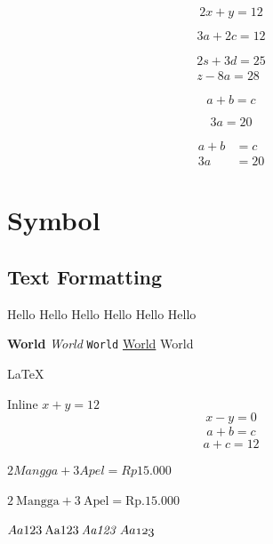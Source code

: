 \documentclass{article}
\begin{document}
    \begin{equation}
        2x + y = 12
    \end{equation}

    \begin{equation*}
        3a + 2c = 12
    \end{equation*}

    \begin{align*}
        2s + 3d = 25\\
        z - 8a = 28 
    \end{align*}

    \begin{equation*}
        a + b = c
    \end{equation*}

    \begin{equation*}
        3a = 20
    \end{equation*}

    \begin{align*}
        a + b &= c\\
        3a &= 20 
    \end{align*}

    \newpage
    \section{Symbol}
    \subsection{Text Formatting}

    {\tiny Hello} {\small Hello}
    {\normalsize Hello} Hello
    {\large Hello} {\huge Hello}

    \textbf{World}
    \textit{World}
    \texttt{World}
    \underline{World}
    \textrm{World}

    \LaTeX

    Inline $x + y = 12$
    \begin{equation}
        x - y = 0
    \end{equation}
    \begin{align}
        a + b = c
    \end{align}
    $$a + c = 12$$

    $2 Mangga + 3 Apel = Rp 15.000$

    $2 \: \textrm{Mangga} + 3 \: \textrm{Apel} 
    = \textrm{Rp.} 15.000$

    $Aa123 \: \mathrm{Aa123} \:
    \mathit{Aa123} \: \mathnormal{Aa123}$
\end{document}
